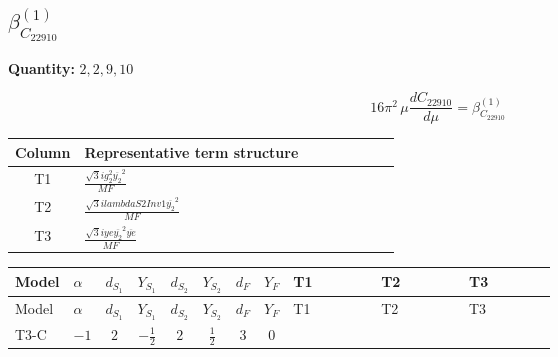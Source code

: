 \documentclass[8pt]{article}
\begin{document}
\begin{landscape}
\section*{$\beta_{C_{22910}}^{(1)}$}
\noindent\textbf{Quantity: }$\mathrm{2,2,9,10}$\par\smallskip
\[16\pi^2\,\mu\frac{d C_{22910}}{d\mu}=\beta_{C_{22910}}^{(1)}\]
\begin{center}
\begin{tabular}{@{}c >{\raggedright\arraybackslash}p{0.82\linewidth}@{}}
\toprule
Column & Representative term structure \\
\midrule
T1 & \(\displaystyle \frac{\sqrt{3} i g_{2}^{2} \overline{y_{2}}^{2}}{MF}\) \\
\midrule
T2 & \(\displaystyle \frac{\sqrt{3} i lambdaS2Inv1 \overline{y_{2}}^{2}}{MF}\) \\
\midrule
T3 & \(\displaystyle \frac{\sqrt{3} i ye \overline{y_{2}}^{2} \overline{ye}}{MF}\) \\
\midrule
\bottomrule
\end{tabular}
\end{center}
\smallskip
\tiny
\begin{longtable}{@{}llcccccc >{\raggedright\arraybackslash}p{0.21\linewidth} >{\raggedright\arraybackslash}p{0.21\linewidth} >{\raggedright\arraybackslash}p{0.21\linewidth}@{}}
\toprule
Model & $\alpha$ & $d_{S_1}$ & $Y_{S_1}$ & $d_{S_2}$ & $Y_{S_2}$ & $d_F$ & $Y_F$ & T1 & T2 & T3 \\
\midrule
\endfirsthead
\toprule
Model & $\alpha$ & $d_{S_1}$ & $Y_{S_1}$ & $d_{S_2}$ & $Y_{S_2}$ & $d_F$ & $Y_F$ & T1 & T2 & T3 \\
\midrule
\endhead
T3-C & $-1$ & $2$ & $-\frac{1}{2}$ & $2$ & $\frac{1}{2}$ & $3$ & $0$ & \scriptsize\adjustbox{max width=\linewidth}{$\begin{gathered} - \frac{\sqrt{3} i g_{2}^{2} \overline{y_{2}}^{2}}{4 MF}\end{gathered}$} & \scriptsize\adjustbox{max width=\linewidth}{$\begin{gathered} - \frac{\sqrt{3} i lambdaS2Inv1 \overline{y_{2}}^{2}}{6 MF}\end{gathered}$} & \scriptsize\adjustbox{max width=\linewidth}{$\begin{gathered} \frac{\sqrt{3} i ye \overline{y_{2}}^{2} \overline{ye}}{12 MF}\end{gathered}$} \\
\midrule
\bottomrule
\end{longtable}
\clearpage

\end{landscape}
\end{document}
